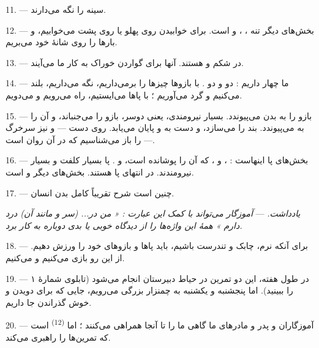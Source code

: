 11. ---  سینه را نگه می‌دارند.

12. --- بخش‌های دیگر تنه ، ، 
و  است. برای خوابیدن روی پهلو یا روی پشت می‌خوابیم، و
بارها را روی شانهٔ خود می‌بریم.

13. --- در شکم  و  هستند. آنها برای گواردن
خوراک به کار ما می‌آیند.

\VUsaut{4.4mm}
\VUsaut{3.0mm}

14. --- ما چهار  داریم : دو  و دو
. با بازوها چیزها را برمی‌داریم، نگه می‌داریم، بلند می‌کنیم
و گرد می‌آوریم ؛ با پاها می‌ایستیم، راه می‌رویم و می‌دویم.

15. ---  بازو را به بدن می‌پیوندد.  بسیار
نیرومندی، یعنی دوسر، بازو را می‌جنباند، و  آن را به
 می‌پیوندد.  بند  را می‌سازد، و
دست به  و  پایان می‌یابد. روی دست
 — و نیز سرخرگ — را باز می‌شناسیم که  در آن
روان است.

16. --- بخش‌های پا اینهاست : ،  و ،  که  آن را  پوشانده است،
 و .  پا بسیار کلفت و
بسیار نیرومندند. در انتهای پا  هستند. بخش‌های دیگر
 و  است.

17. --- چنین است شرح تقریباً کامل بدن انسان.

\textit{یادداشت.} --- \textit{آموزگار می‌تواند با کمک این عبارت :
« من در... (سر و مانند آن) درد دارم » همهٔ این واژه‌ها را از دیدگاه
خوبی یا بدی}  \textit{دوباره به کار برد.}

\VUsaut{5.0mm}
\VUsaut{2.4mm}
\VUsaut{3.0mm}

18. --- برای آنکه نرم، چابک و تندرست باشیم، باید پاها و بازوهای خود را
ورزش دهیم. از این رو بازی می‌کنیم و  می‌کنیم.

19. --- در طول هفته، این دو تمرین در حیاط دبیرستان انجام می‌شود (تابلوی
شمارهٔ ۱ را ببینید). اما پنجشنبه و یکشنبه به چمنزار بزرگی می‌رویم، جایی
که برای دویدن و خوش گذراندن جا داریم.

20. --- آموزگاران و پدر و مادرهای ما گاهی ما را تا آنجا همراهی می‌کنند ؛
اما \textsuperscript{(12)} است که تمرین‌ها را
راهبری می‌کند.

